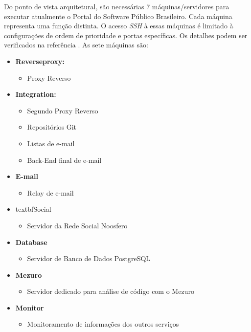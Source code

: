 Do ponto de vista arquitetural, são necessárias 7 máquinas/servidores para
executar atualmente o Portal do
Software Público Brasileiro. Cada máquina representa uma função distinta. O
acesso \textit{SSH} à essas máquinas é limitado à configurações de ordem de
prioridade e portas específicas. Os detalhes podem ser verificados na
referência \cite{archSPB}. As sete máquinas são:

\begin{itemize}
  \item \textbf{Reverseproxy:}
  \begin{itemize}
    \item Proxy Reverso
  \end{itemize}

  \item \textbf{Integration:}
    \begin{itemize}
      \item Segundo Proxy Reverso
      \item Repositórios Git
      \item Listas de e-mail
      \item Back-End final de e-mail
    \end{itemize}

  \item \textbf{E-mail}
  \begin{itemize}
    \item Relay de e-mail
  \end{itemize}

  \item textbf{Social}
  \begin{itemize}
    \item Servidor da Rede Social Noosfero
  \end{itemize}

  \item \textbf{Database}
  \begin{itemize}
    \item{Servidor de Banco de Dados PostgreSQL}
  \end{itemize}

  \item \textbf{Mezuro}
  \begin{itemize}
    \item Servidor dedicado para análise de código com o Mezuro
  \end{itemize}

  \item \textbf{Monitor}
  \begin{itemize}
    \item Monitoramento de informações dos outros serviços
  \end{itemize}
\end{itemize}

